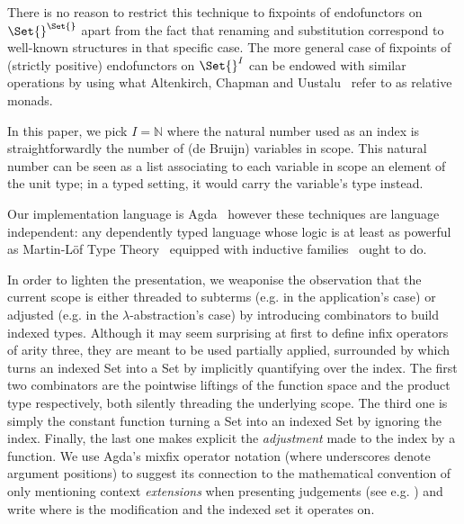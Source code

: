 There is no reason to restrict this technique to fixpoints of endofunctors
on $\Set{}^{\Set{}}$ apart from the fact that renaming and substitution
correspond to well-known structures in that specific case. The more general
case of fixpoints of (strictly positive) endofunctors on $\Set{}^I$ can be
endowed with similar operations by using what Altenkirch, Chapman and
Uustalu~\citeyear{Altenkirch2010, JFR4389} refer to as relative monads.

In this paper, we pick $I = \mathbb{N}$ where the natural number used as
an index is straightforwardly the number of (de Bruijn) variables in scope.
This natural number can be seen as a list associating to each variable in
scope an element of the unit type; in a typed setting, it would carry the
variable's type instead.

Our implementation language is Agda~\cite{norell2009dependently} however
these techniques are language independent: any dependently typed language
whose logic is at least as powerful as Martin-L\"of Type
Theory~\cite{martin1982constructive} equipped with inductive
families~\cite{dybjer1994inductive} ought to do.

In order to lighten the presentation, we weaponise the observation that the
current scope is either threaded to subterms (e.g. in the application's case)
or adjusted (e.g. in the $\lambda$-abstraction's case) by introducing combinators
to build indexed types. Although it may seem surprising at first to define
infix operators of arity three, they are meant to be used partially applied,
surrounded by \AF{[\_]} which turns an indexed Set into a Set by implicitly
quantifying over the index. The first two combinators are the pointwise liftings
of the function space and the product type respectively, both silently threading
the underlying scope. The third one is simply the constant function turning a Set
into an indexed Set by ignoring the index. Finally, the last one makes explicit
the \emph{adjustment} made to the index by a function. We use Agda's mixfix operator
notation (where underscores denote argument positions) to suggest its connection
to the mathematical convention of only mentioning context \emph{extensions} when
presenting judgements (see e.g. \cite{martin1982constructive}) and write
   where  is the modification and 
the indexed set it operates on.

